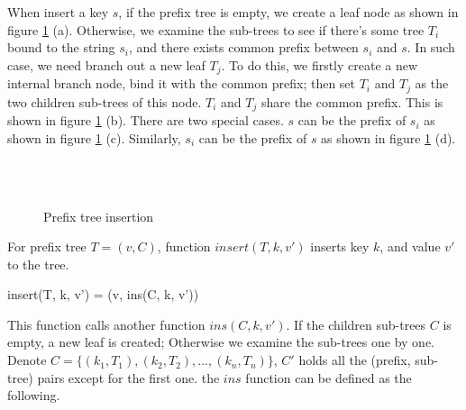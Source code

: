 \documentclass{article}
\begin{document}
When insert a key $s$, if the prefix tree is empty, we
create a leaf node as shown in figure \ref{fig:patricia-insert} (a).
Otherwise, we examine the sub-trees to see if
there's some tree $T_i$ bound to the string $s_i$,
and there exists common prefix between $s_i$ and $s$. In such case, we
need branch out a new leaf $T_j$. To do this, we firstly
create a new internal branch node, bind it with the common
prefix; then set $T_i$ and $T_j$ as the two children sub-trees of this node.
$T_i$ and $T_j$ share the common
prefix. This is shown in figure \ref{fig:patricia-insert} (b).
There are two special cases. $s$ can be the prefix of $s_i$
as shown in figure \ref{fig:patricia-insert} (c). Similarly,
$s_i$ can be the prefix of $s$ as shown in figure \ref{fig:patricia-insert} (d).

\begin{figure}[htbp]
  \centering
  \hspace{.1\textwidth}
   \\
   \\
  \caption{Prefix tree insertion}
  \label{fig:patricia-insert}
\end{figure}

For prefix tree $T = (v, C)$, function $insert(T, k, v')$ inserts
key $k$, and value $v'$ to the tree.

\be
insert(T, k, v') = (v, ins(C, k, v'))
\ee

This function calls another function $ins(C, k, v')$.
If the children sub-trees $C$ is empty, a new leaf is created; Otherwise
we examine the sub-trees one by one. Denote $C = \{(k_1, T_1), (k_2, T_2), ..., (k_n, T_n)\}$,
$C'$ holds all the (prefix, sub-tree) pairs except for the first one. the
$ins$ function can be defined as the following.
\end{document}
